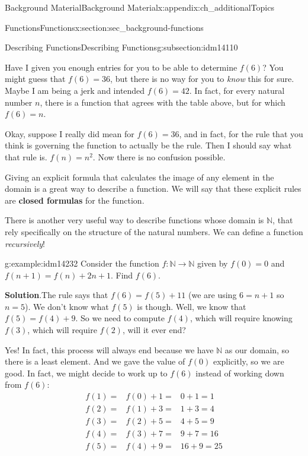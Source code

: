 \documentclass[oneside,10pt,]{book}
\newcommand{\terminology}[1]{\textbf{#1}}
\numberwithin{equation}{chapter}
\def\N{\mathbb N}
\newcommand{\amp}{&}
\begin{document}
\begin{appendixptx}{Background Material}{}{Background Material}{}{}{x:appendix:ch_additionalTopics}
\begin{sectionptx}{Functions}{}{Functions}{}{}{x:section:sec_background-functions}
\begin{subsectionptx}{Describing Functions}{}{Describing Functions}{}{}{g:subsection:idm14110}
\begin{sidebyside}{1}{0}{0}{0}
\end{sidebyside}%
\par
Have I given you enough entries for you to be able to determine \(f(6)\)?  You might guess that \(f(6) = 36\), but there is no way for you to \emph{know} this for sure.  Maybe I am being a jerk and intended \(f(6) = 42\).  In fact, for every natural number \(n\), there is a function that agrees with the table above, but for which \(f(6) = n\).%
\par
Okay, suppose I really did mean for \(f(6) = 36\), and in fact, for the rule that you think is governing the function to actually be the rule.  Then I should say what that rule is.  \(f(n) = n^2\).  Now there is no confusion possible.%
\par
{} Giving an explicit formula that calculates the image of any element in the domain is a great way to describe a function.  We will say that these explicit rules are \terminology{closed formulas} for the function.%
\par
There is another very useful way to describe functions whose domain is \(\N\), that rely specifically on the structure of the natural numbers.  We can define a function \emph{recursively}!%
\begin{example}{}{g:example:idm14232}%
Consider the function \(f:\N \to \N\) given by \(f(0) = 0\) and \(f(n+1) = f(n) + 2n+1\).  Find \(f(6)\).%
\par\smallskip%
\noindent\textbf{Solution}.\hypertarget{g:solution:idm14239}{}\quad{}The rule says that \(f(6) = f(5) + 11\) (we are using \(6 = n+1\) so \(n = 5\)).  We don't know what \(f(5)\) is though.  Well, we know that \(f(5) = f(4) + 9\).  So we need to compute \(f(4)\), which will require knowing \(f(3)\), which will require \(f(2)\),\textellipsis{} will it ever end?%
\par
Yes!  In fact, this process will always end because we have \(\N\) as our domain, so there is a least element.  And we gave the value of \(f(0)\) explicitly, so we are good.  In fact, we might decide to work up to \(f(6)\) instead of working down from \(f(6)\):%
\begin{align*}
f(1) = \amp f(0) + 1 = \amp 0 + 1 = 1\\
f(2) = \amp f(1) + 3 = \amp 1 + 3 = 4\\
f(3) = \amp f(2) + 5 = \amp 4 + 5 = 9\\
f(4) = \amp f(3) + 7 = \amp 9 + 7 = 16\\
f(5) = \amp f(4) + 9 = \amp 16 + 9 = 25\\

\end{align*}
\end{example}
\end{subsectionptx}
\end{sectionptx}
\end{appendixptx}
\end{document}
